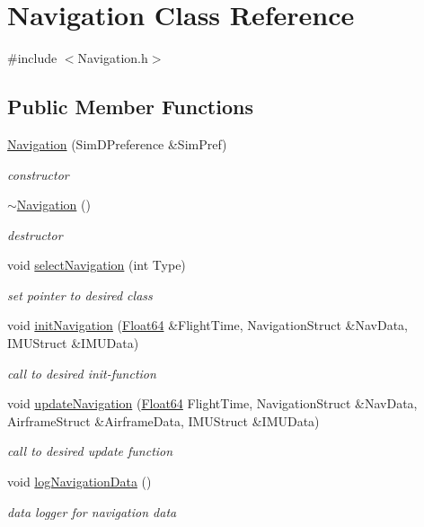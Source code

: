 \hypertarget{class_navigation}{}\section{Navigation Class Reference}
\label{class_navigation}


{\ttfamily \#include $<$Navigation.\+h$>$}

\subsection*{Public Member Functions}
\begin{DoxyCompactItemize}
\item 
\hyperlink{class_navigation_a00594eb04a4ec3c7b40ce73bec65f1ee}{Navigation} (Sim\+D\+Preference \&Sim\+Pref)
\begin{DoxyCompactList}\small\item\em constructor \end{DoxyCompactList}\item 
\hyperlink{class_navigation_addd4022d716df48f4e55a1db69361ba7}{$\sim$\+Navigation} ()
\begin{DoxyCompactList}\small\item\em destructor \end{DoxyCompactList}\item 
void \hyperlink{class_navigation_a28fa35df18463041f124bfca64192b1d}{select\+Navigation} (int Type)
\begin{DoxyCompactList}\small\item\em set pointer to desired class \end{DoxyCompactList}\item 
void \hyperlink{class_navigation_a4c870d2fe260f06003503c32e22fd1f3}{init\+Navigation} (\hyperlink{group___tools_ga3f1431cb9f76da10f59246d1d743dc2c}{Float64} \&Flight\+Time, Navigation\+Struct \&Nav\+Data, I\+M\+U\+Struct \&I\+M\+U\+Data)
\begin{DoxyCompactList}\small\item\em call to desired init-\/function \end{DoxyCompactList}\item 
void \hyperlink{class_navigation_a0207da055af9d6c0262a4cbd9e39ce19}{update\+Navigation} (\hyperlink{group___tools_ga3f1431cb9f76da10f59246d1d743dc2c}{Float64} Flight\+Time, Navigation\+Struct \&Nav\+Data, Airframe\+Struct \&Airframe\+Data, I\+M\+U\+Struct \&I\+M\+U\+Data)
\begin{DoxyCompactList}\small\item\em call to desired update function \end{DoxyCompactList}\item 
void \hyperlink{class_navigation_a6481240b0375c18dc9618746e9e47755}{log\+Navigation\+Data} ()
\begin{DoxyCompactList}\small\item\em data logger for navigation data \end{DoxyCompactList}\end{DoxyCompactItemize}


